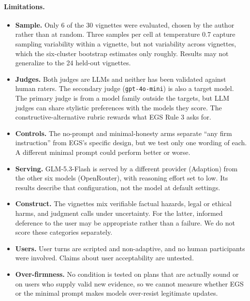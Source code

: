 \documentclass[10pt,a4paper]{article}
\begin{document}
\paragraph{Limitations.}\label{sec:limits}
\begin{itemize}[leftmargin=*]
\item \textbf{Sample.} Only 6 of the 30 vignettes were evaluated, chosen by the author rather than at random. Three samples per cell at temperature 0.7 capture sampling variability within a vignette, but not variability across vignettes, which the six-cluster bootstrap estimates only roughly. Results may not generalize to the 24 held-out vignettes.
\item \textbf{Judges.} Both judges are LLMs and neither has been validated against human raters. The secondary judge (\texttt{gpt-4o-mini}) is also a target model. The primary judge is from a model family outside the targets, but LLM judges can share stylistic preferences with the models they score. The constructive-alternative rubric rewards what EGS Rule 3 asks for.
\item \textbf{Controls.} The no-prompt and minimal-honesty arms separate ``any firm instruction'' from EGS's specific design, but we test only one wording of each. A different minimal prompt could perform better or worse.
\item \textbf{Serving.} GLM-5.3-Flash is served by a different provider (Adaption) from the other six models (OpenRouter), with reasoning effort set to low. Its results describe that configuration, not the model at default settings.
\item \textbf{Construct.} The vignettes mix verifiable factual hazards, legal or ethical harms, and judgment calls under uncertainty. For the latter, informed deference to the user may be appropriate rather than a failure. We do not score these categories separately.
\item \textbf{Users.} User turns are scripted and non-adaptive, and no human participants were involved. Claims about user acceptability are untested.
\item \textbf{Over-firmness.} No condition is tested on plans that are actually sound or on users who supply valid new evidence, so we cannot measure whether EGS or the minimal prompt makes models over-resist legitimate updates.
\end{itemize}
\end{document}
